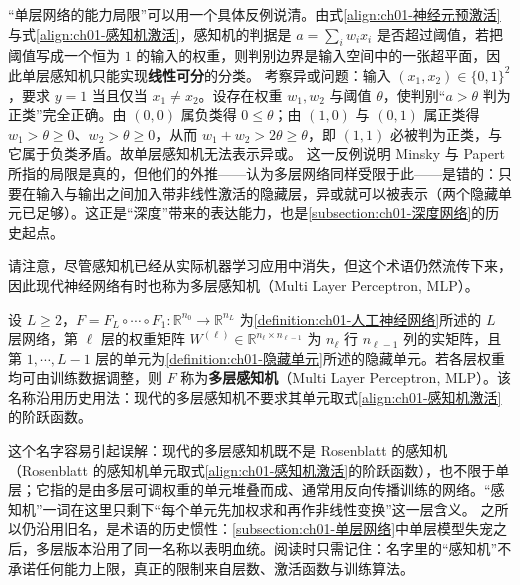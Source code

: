 \documentclass[../../main.tex]{subfiles}
\begin{document}
\begin{remark}
“单层网络的能力局限”可以用一个具体反例说清。由式\eqref{align:ch01-神经元预激活}与式\eqref{align:ch01-感知机激活}，感知机的判据是 $a=\sum_i w_i x_i$ 是否超过阈值，若把阈值写成一个恒为 $1$ 的输入的权重，则判别边界是输入空间中的一张超平面，因此单层感知机只能实现\textbf{线性可分}的分类。
考察异或问题：输入 $(x_1,x_2)\in\{0,1\}^{2}$，要求 $y=1$ 当且仅当 $x_1\neq x_2$。设存在权重 $w_1,w_2$ 与阈值 $\theta$，使判别“$a>\theta$ 判为正类”完全正确。由 $(0,0)$ 属负类得 $0\leqslant\theta$；由 $(1,0)$ 与 $(0,1)$ 属正类得 $w_1>\theta\geqslant 0$、$w_2>\theta\geqslant 0$，从而 $w_1+w_2>2\theta\geqslant\theta$，即 $(1,1)$ 必被判为正类，与它属于负类矛盾。故单层感知机无法表示异或。
这一反例说明 Minsky 与 Papert 所指的局限是真的，但他们的外推——认为多层网络同样受限于此——是错的：只要在输入与输出之间加入带非线性激活的隐藏层，异或就可以被表示（两个隐藏单元已足够）。这正是“深度”带来的表达能力，也是\cref{subsection:ch01-深度网络}的历史起点。
\end{remark}

请注意，尽管感知机已经从实际机器学习应用中消失，但这个术语仍然流传下来，因此现代神经网络有时也称为多层感知机（Multi Layer Perceptron, MLP）。

\begin{definition}[多层感知机]\label{definition:ch01-多层感知机}
设 $L\geqslant2$，$F=F_{L}\circ\cdots\circ F_{1}:\mathbb{R}^{n_{0}}\to\mathbb{R}^{n_{L}}$ 为\cref{definition:ch01-人工神经网络}所述的 $L$ 层网络，第 $\ell$ 层的权重矩阵 $W^{(\ell)}\in\mathbb{R}^{n_{\ell}\times n_{\ell-1}}$ 为 $n_{\ell}$ 行 $n_{\ell-1}$ 列的实矩阵，且第 $1,\cdots,L-1$ 层的单元为\cref{definition:ch01-隐藏单元}所述的隐藏单元。若各层权重均可由训练数据调整，则 $F$ 称为\textbf{多层感知机}（Multi Layer Perceptron, MLP）。该名称沿用历史用法：现代的多层感知机不要求其单元取式\eqref{align:ch01-感知机激活}的阶跃函数。
\end{definition}

\begin{remark}
这个名字容易引起误解：现代的多层感知机既不是 Rosenblatt 的感知机（Rosenblatt 的感知机单元取式\eqref{align:ch01-感知机激活}的阶跃函数），也不限于单层；它指的是由多层可调权重的单元堆叠而成、通常用反向传播训练的网络。“感知机”一词在这里只剩下“每个单元先加权求和再作非线性变换”这一层含义。
之所以仍沿用旧名，是术语的历史惯性：\cref{subsection:ch01-单层网络}中单层模型失宠之后，多层版本沿用了同一名称以表明血统。阅读时只需记住：名字里的“感知机”不承诺任何能力上限，真正的限制来自层数、激活函数与训练算法。
\end{remark}
\end{document}
